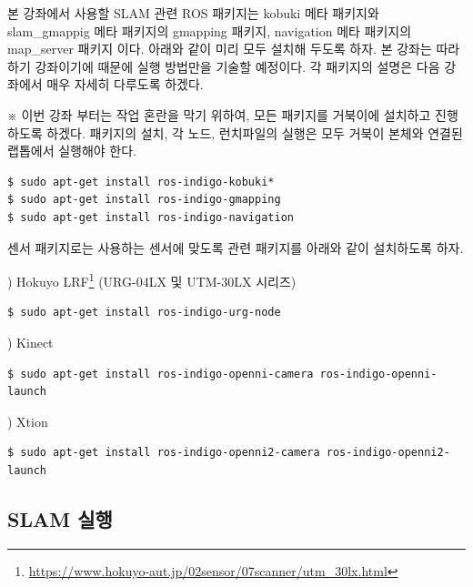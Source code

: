 본 강좌에서 사용할 SLAM 관련 ROS 패키지는 kobuki 메타 패키지와 slam\_gmappig 메타 패키지의 gmapping 패키지, navigation 메타 패키지의 map\_server 패키지 이다. 아래와 같이 미리 모두 설치해 두도록 하자. 본 강좌는 따라하기 강좌이기에 때문에 실행 방법만을 기술할 예정이다. 각 패키지의 설명은 다음 강좌에서 매우 자세히 다루도록 하겠다. 

\noindent
※ 이번 강좌 부터는 작업 혼란을 막기 위하여, 모든 패키지를 거북이에 설치하고 진행하도록 하겠다. 패키지의 설치, 각 노드, 런치파일의 실행은 모두 거북이 본체와 연결된 랩톱에서 실행해야 한다.

\vspace{\baselineskip}
\begin{lstlisting}[language=ROS]
$ sudo apt-get install ros-indigo-kobuki*
$ sudo apt-get install ros-indigo-gmapping
$ sudo apt-get install ros-indigo-navigation
\end{lstlisting}

\noindent
센서 패키지로는 사용하는 센서에 맞도록 관련 패키지를 아래와 같이 설치하도록 하자.

\setcounter{num}{0}

\vspace{\baselineskip}
\noindent
{}
\thenum) Hokuyo LRF\footnote{\url{https://www.hokuyo-aut.jp/02sensor/07scanner/utm_30lx.html}} (URG-04LX 및 UTM-30LX 시리즈)
\begin{lstlisting}[language=ROS]
$ sudo apt-get install ros-indigo-urg-node
\end{lstlisting}
 
\vspace{\baselineskip}
\noindent
{}
\thenum) Kinect
\begin{lstlisting}[language=ROS]
$ sudo apt-get install ros-indigo-openni-camera ros-indigo-openni-launch
\end{lstlisting}


\vspace{\baselineskip}
\noindent
{}
\thenum) Xtion
\begin{lstlisting}[language=ROS]
$ sudo apt-get install ros-indigo-openni2-camera ros-indigo-openni2-launch
\end{lstlisting}


\subsection{SLAM 실행}

